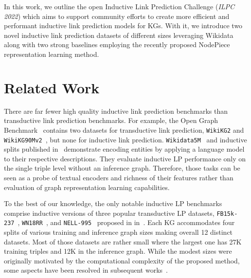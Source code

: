 \documentclass[sigconf,screen]{acmart}
\newcommand{\ilpc}{\textsl{\textsc{ILPC 2022}}\xspace}
\begin{document}
In this work, we outline the open Inductive Link Prediction Challenge (\ilpc) which aims to support community efforts to create more efficient and performant inductive link prediction models for KGs.
With it, we introduce two novel inductive link prediction datasets of different sizes leveraging Wikidata~\cite{vrandevcic2014wikidata} along with two strong baselines employing the recently proposed NodePiece~\cite{galkin2022nodepiece} representation learning method. 


\section{Related Work}

There are far fewer high quality inductive link prediction benchmarks than transductive link prediction benchmarks.
For example, the Open Graph Benchmark~\cite{hu2020open} contains two datasets for transductive link prediction, \texttt{WikiKG2} and \texttt{WikiKG90Mv2}~\cite{hu2021ogblsc}, but none for inductive link prediction.
\texttt{Wikidata5M}~\cite{DBLP:journals/tacl/WangGZZLLT21} and inductive splits published in~\cite{daza2021inductive} demonstrate encoding entities by applying a language model to their respective descriptions. 
They evaluate inductive LP performance only on the single triple level without an inference graph. 
Therefore, those tasks can be seen as a probe of textual encoders and richness of their features rather than evaluation of graph representation learning capabilities. 

To the best of our knowledge, the only notable inductive LP benchmarks comprise inductive versions of three popular transductive LP datasets, \texttt{FB15k-237}~\cite{toutanova-chen-2015-observed}, \texttt{WN18RR}~\cite{DBLP:conf/aaai/DettmersMS018}, and \texttt{NELL-995}~\cite{chen2018variational} proposed in in~\cite{teru2020inductive}. 
Each KG accommodates four splits of various training and inference graph sizes making overall 12 distinct datasets.
Most of those datasets are rather small where the largest one has 27K training triples and 12K in the inference graph.
While the modest sizes were originally motivated by the computational complexity of the proposed method, some aspects have been resolved in subsequent works~\cite{zhu2021neural, galkin2022nodepiece}.
\end{document}
